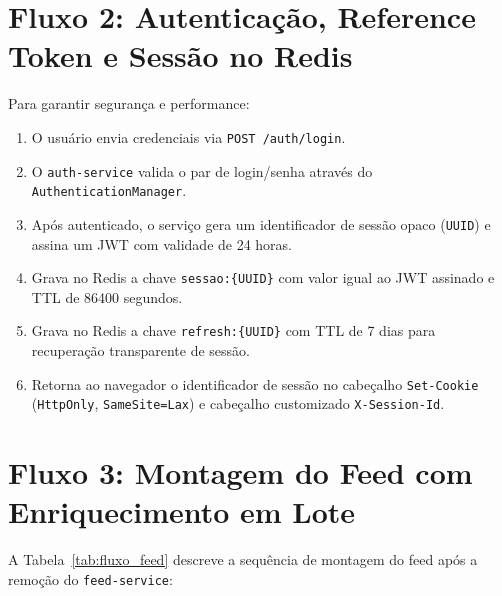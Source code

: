 \documentclass[12pt,a4paper]{report}
\begin{document}
\section{Fluxo 2: Autenticação, Reference Token e Sessão no Redis}
Para garantir segurança e performance:
\begin{enumerate}
    \item O usuário envia credenciais via \texttt{POST /auth/login}.
    \item O \texttt{auth-service} valida o par de login/senha através do \texttt{AuthenticationManager}.
    \item Após autenticado, o serviço gera um identificador de sessão opaco (\texttt{UUID}) e assina um JWT com validade de 24 horas.
    \item Grava no Redis a chave \texttt{sessao:\{UUID\}} com valor igual ao JWT assinado e TTL de 86400 segundos.
    \item Grava no Redis a chave \texttt{refresh:\{UUID\}} com TTL de 7 dias para recuperação transparente de sessão.
    \item Retorna ao navegador o identificador de sessão no cabeçalho \texttt{Set-Cookie} (\texttt{HttpOnly}, \texttt{SameSite=Lax}) e cabeçalho customizado \texttt{X-Session-Id}.
\end{enumerate}

\section{Fluxo 3: Montagem do Feed com Enriquecimento em Lote}
A Tabela~\ref{tab:fluxo_feed} descreve a sequência de montagem do feed após a remoção do \texttt{feed-service}:
\end{document}
